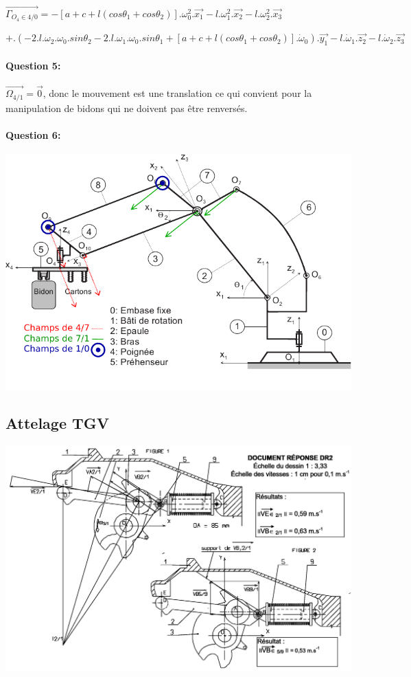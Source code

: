 ~\

$\overrightarrow{\Gamma_{O_{4}\in 4/0}}=-\left[a+c+l(cos\theta_1+cos\theta_2)\right].\omega_0^2.\overrightarrow{x_1}-l.\omega_1^2.\overrightarrow{x_2}-l.\omega_2^2.\overrightarrow{x_3}$

$+.\left(-2.l.\omega_2.\omega_0.sin\theta_2-2.l.\omega_1.\omega_0.sin\theta_1+\left[a+c+l(cos\theta_1+cos\theta_2)\right].\dot{\omega}_{0}\right).\overrightarrow{y_1}-l.\dot{\omega}_1.\overrightarrow{z_2}-l.\dot{\omega}_2.\overrightarrow{z_3}$


\paragraph{Question 5:} $\overrightarrow{\Omega_{4/1}}=\overrightarrow{0}$, donc le mouvement est une translation ce qui convient pour la manipulation de bidons qui ne doivent pas être renversés.

\paragraph{Question 6:}

\begin{center}
 \includegraphics[width=0.8\linewidth]{img/annexe_robot_cor}
\end{center}

\newpage

\subsection{Attelage TGV}

\begin{center}
 \includegraphics[width=0.8\linewidth]{img/correction_tgv}
\end{center}

